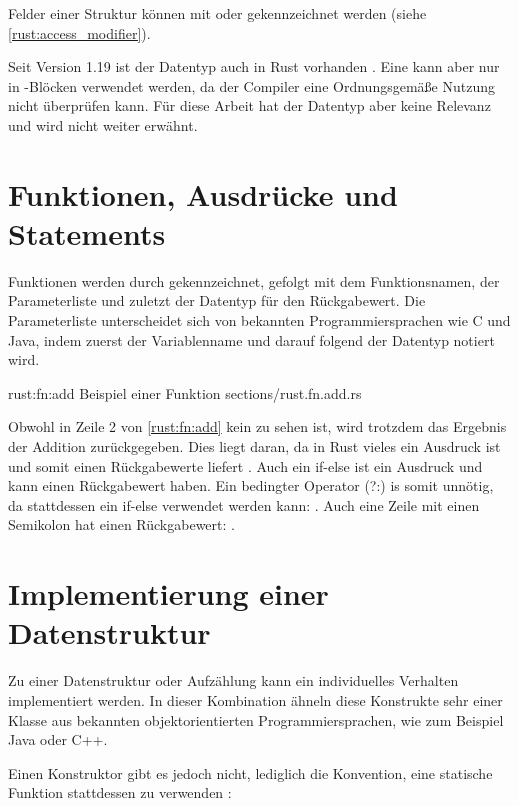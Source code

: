 Felder einer Struktur können mit  oder  gekennzeichnet werden (siehe \autoref{rust:access_modifier}).

Seit Version 1.19 ist der Datentyp  auch in Rust vorhanden \cite{rust:v1.19}.
Eine  kann aber nur in -Blöcken verwendet werden, da der Compiler eine Ordnungsgemäße Nutzung nicht überprüfen kann.
Für diese Arbeit hat der Datentyp aber keine Relevanz und wird nicht weiter erwähnt.

\section{Funktionen, Ausdrücke und Statements}

Funktionen werden durch  gekennzeichnet, gefolgt mit dem Funktionsnamen, der Parameterliste und zuletzt der Datentyp für den Rückgabewert.
Die Parameterliste unterscheidet sich von bekannten Programmiersprachen wie C und Java, indem zuerst der Variablenname und darauf folgend der Datentyp notiert wird.

\rustcinclude
	{rust:fn:add}
	{Beispiel einer Funktion}
	{sections/rust.fn.add.rs}
	
Obwohl in Zeile 2 von \autoref{rust:fn:add} kein  zu sehen ist, wird trotzdem das Ergebnis der Addition zurückgegeben.
Dies liegt daran, da in Rust vieles ein Ausdruck ist und somit einen Rückgabewerte liefert \cite{rust:book:statements}.
Auch ein if-else ist ein Ausdruck und kann einen Rückgabewert haben.
Ein bedingter Operator (?:) is somit unnötig, da stattdessen ein if-else verwendet werden kann: . 
Auch eine Zeile mit einen Semikolon hat einen Rückgabewert: \rustcinline{()}. 

\section{Implementierung einer Datenstruktur}

Zu einer Datenstruktur oder Aufzählung kann ein individuelles Verhalten implementiert werden.
In dieser Kombination ähneln diese Konstrukte sehr einer Klasse aus bekannten objektorientierten Programmiersprachen, wie zum Beispiel Java oder C++. 

Einen Konstruktor gibt es jedoch nicht, lediglich die Konvention, eine statische Funktion  stattdessen zu verwenden \cite{rust:book:constructors}:

